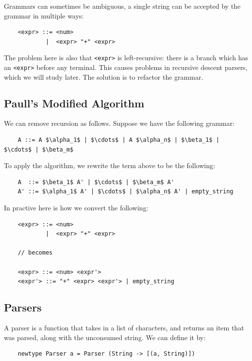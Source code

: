 \documentclass[a4paper,12pt]{article}
\theoremstyle{remark}
\begin{document}
Grammars can sometimes be ambiguous, a single string can be accepted by the grammar
in multiple ways:

\begin{lstlisting}
    <expr> ::= <num>
            |  <expr> "+" <expr>  \end{lstlisting}

The problem here is also that \lstinline{<expr>} is left-recursive: there is a branch which
has an \lstinline{<expr>} before any terminal. This causes problems in recursive descent parsers,
which we will study later. The solution is to refactor the grammar.

\subsection{Paull's Modified Algorithm}

We can remove recursion as follows. Suppose we have the following grammar:

\begin{lstlisting}
    A ::= A $\alpha_1$ | $\cdots$ | A $\alpha_n$ | $\beta_1$ | $\cdots$ | $\beta_m$  \end{lstlisting}

To apply the algorithm, we rewrite the term above to be the following:

\begin{lstlisting}
    A  ::= $\beta_1$ A' | $\cdots$ | $\beta_m$ A'
    A' ::= $\alpha_1$ A' | $\cdots$ | $\alpha_n$ A' | empty_string  \end{lstlisting}

In practive here is how we convert the following:

\begin{lstlisting}
    <expr> ::= <num>
            |  <expr> "+" <expr>

    // becomes

    <expr> ::= <num> <expr'>
    <expr'> ::= "+" <expr> <expr'> | empty_string  \end{lstlisting}

\subsection{Parsers}

A parser is a function that takes in a list of characters, and returns an item that
was parsed, along with the unconsumed string. We can define it by:

\begin{lstlisting}
    newtype Parser a = Parser (String -> [(a, String)])  \end{lstlisting}
\end{document}

